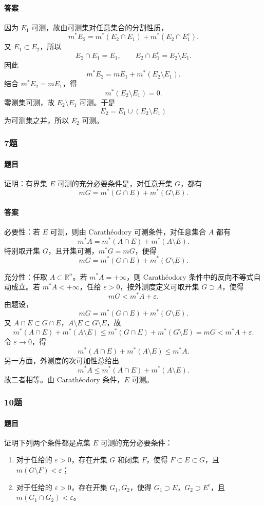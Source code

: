 \documentclass{article}
\newcommand{\eps}{\varepsilon}
\begin{document}
\paragraph{答案} 因为 $E_1$ 可测，故由可测集对任意集合的分割性质，
\[
 m^*E_2=m^*(E_2\cap E_1)+m^*(E_2\cap E_1^c).
\]
又 $E_1\subset E_2$，所以
\[
 E_2\cap E_1=E_1,\qquad E_2\cap E_1^c=E_2\setminus E_1.
\]
因此
\[
 m^*E_2=mE_1+m^*(E_2\setminus E_1).
\]
结合 $m^*E_2=mE_1$，得
\[
 m^*(E_2\setminus E_1)=0.
\]
零测集可测，故 $E_2\setminus E_1$ 可测。于是
\[
 E_2=E_1\cup(E_2\setminus E_1)
\]
为可测集之并，所以 $E_2$ 可测。

\subsubsection*{7题}
\paragraph{题目} 证明：有界集 $E$ 可测的充分必要条件是，对任意开集 $G$，都有
\[
 mG=m^*(G\cap E)+m^*(G\setminus E).
\]

\paragraph{答案} 必要性：若 $E$ 可测，则由 Carath\'{e}odory 可测条件，对任意集合 $A$ 都有
\[
 m^*A=m^*(A\cap E)+m^*(A\setminus E).
\]
特别取开集 $G$，且开集可测，$m^*G=mG$，便得
\[
 mG=m^*(G\cap E)+m^*(G\setminus E).
\]

充分性：任取 $A\subset\mathbb{R}^n$。若 $m^*A=+\infty$，则 Carath\'{e}odory 条件中的反向不等式自动成立。若 $m^*A<+\infty$，任给 $\eps>0$，按外测度定义可取开集 $G\supset A$，使得
\[
 mG<m^*A+\eps.
\]
由题设，
\[
 mG=m^*(G\cap E)+m^*(G\setminus E).
\]
又 $A\cap E\subset G\cap E$，$A\setminus E\subset G\setminus E$，故
\[
 m^*(A\cap E)+m^*(A\setminus E)
\le m^*(G\cap E)+m^*(G\setminus E)=mG<m^*A+\eps.
\]
令 $\eps\to0$，得
\[
 m^*(A\cap E)+m^*(A\setminus E)
\le m^*A.
\]
另一方面，外测度的次可加性总给出
\[
 m^*A\le m^*(A\cap E)+m^*(A\setminus E).
\]
故二者相等。由 Carath\'{e}odory 条件，$E$ 可测。

\subsubsection*{10题}
\paragraph{题目} 证明下列两个条件都是点集 $E$ 可测的充分必要条件：
\begin{enumerate}[label=(\arabic*)]
\item 对于任给的 $\eps>0$，存在开集 $G$ 和闭集 $F$，使得 $F\subset E\subset G$，且 $m(G\setminus F)<\eps$；
\item 对于任给的 $\eps>0$，存在开集 $G_1,G_2$，使得 $G_1\supset E$，$G_2\supset E^c$，且 $m(G_1\cap G_2)<\eps$。
\end{enumerate}
\end{document}
